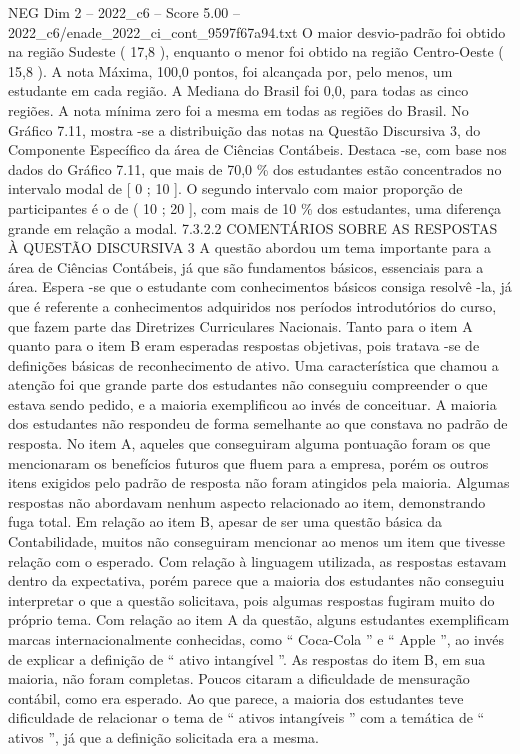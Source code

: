 \begin{textsample}{NEG Dim 2 – 2022\_c6 – Score 5.00 – 2022\_c6/enade\_2022\_ci\_cont\_9597f67a94.txt}
O maior desvio-padrão foi obtido na região Sudeste ( 17,8 ), enquanto o menor foi obtido na região Centro-Oeste ( 15,8 ).
A nota Máxima, 100,0 pontos, foi alcançada por, pelo menos, um estudante em cada região.
A Mediana do Brasil foi 0,0, para todas as cinco regiões.
A nota mínima zero foi a mesma em todas as regiões do Brasil.
No Gráfico 7.11, mostra -se a distribuição das notas na Questão Discursiva 3, do Componente Específico da área de Ciências Contábeis.
Destaca -se, com base nos dados do Gráfico 7.11, que mais de 70,0 \% dos estudantes estão concentrados no intervalo modal de [ 0 ; 10 ].
O segundo intervalo com maior proporção de participantes é o de ( 10 ; 20 ], com mais de 10 \% dos estudantes, uma diferença grande em relação a modal. 7.3.2.2 COMENTÁRIOS SOBRE AS RESPOSTAS À QUESTÃO DISCURSIVA 3 A questão abordou um tema importante para a área de Ciências Contábeis, já que são fundamentos básicos, essenciais para a área.
Espera -se que o estudante com conhecimentos básicos consiga resolvê -la, já que é referente a conhecimentos adquiridos nos períodos introdutórios do curso, que fazem parte das Diretrizes Curriculares Nacionais.
Tanto para o item A quanto para o item B eram esperadas respostas objetivas, pois tratava -se de definições básicas de reconhecimento de ativo.
Uma característica que chamou a atenção foi que grande parte dos estudantes não conseguiu compreender o que estava sendo pedido, e a maioria exemplificou ao invés de conceituar.
A maioria dos estudantes não respondeu de forma semelhante ao que constava no padrão de resposta.
No item A, aqueles que conseguiram alguma pontuação foram os que mencionaram os benefícios futuros que fluem para a empresa, porém os outros itens exigidos pelo padrão de resposta não foram atingidos pela maioria.
Algumas respostas não abordavam nenhum aspecto relacionado ao item, demonstrando fuga total.
Em relação ao item B, apesar de ser uma questão básica da Contabilidade, muitos não conseguiram mencionar ao menos um item que tivesse relação com o esperado.
Com relação à linguagem utilizada, as respostas estavam dentro da expectativa, porém parece que a maioria dos estudantes não conseguiu interpretar o que a questão solicitava, pois algumas respostas fugiram muito do próprio tema.
Com relação ao item A da questão, alguns estudantes exemplificam marcas internacionalmente conhecidas, como “ Coca-Cola ” e “ Apple ”, ao invés de explicar a definição de “ ativo intangível ”.
As respostas do item B, em sua maioria, não foram completas.
Poucos citaram a dificuldade de mensuração contábil, como era esperado.
Ao que parece, a maioria dos estudantes teve dificuldade de relacionar o tema de “ ativos intangíveis ” com a temática de “ ativos ”, já que a definição solicitada era a mesma.

\end{textsample}
